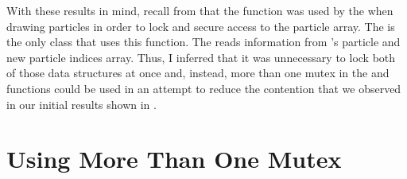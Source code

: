 
With these results in mind, recall from  that the  function was used by the  when drawing particles in order to lock  and secure access to the particle array. The  is the only class that uses this  function. The  reads information from 's particle and new particle indices array. Thus, I inferred that it was unnecessary to lock both of those data structures at once and, instead, more than one mutex in the  and  functions could be used in an attempt to reduce the contention that we observed in our initial results shown in .


\section{Using More Than One Mutex}\label{sec:studies_mutexes}

